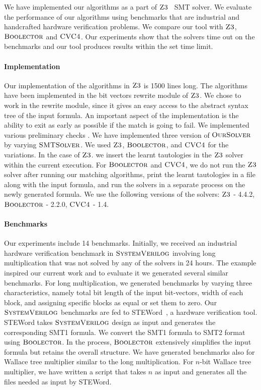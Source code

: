 

We have implemented our algorithms as a part of $\textsc{Z3}$~\cite{z3} SMT solver.
%
 We evaluate the performance of our algorithms using benchmarks that are industrial and handcrafted hardware verification problems.
%
We compare our tool with $\textsc{Z3}$, $\textsc{Boolector}$\cite{boolector} and $\textsc{CVC4}$\cite{cvc4}.
%
Our experiments show that the solvers time out on the benchmarks and our tool produces results within the set time limit.

\paragraph{\bf Implementation}
Our implementation of the algorithms in $\textsc{Z3}$ is 1500 lines long.
%
The algorithms have been implemented in the bit vectors rewrite module of $\textsc{Z3}$.
%
We chose to work in the rewrite module, since it gives an easy access to the abstract syntax tree of the input formula.
%
An important aspect of the implementation is the ability to exit as early as possible if the match is going to fail.
%
We implemented various preliminary checks .
%
We have implemented three version of $\textsc{OurSolver}$ by varying
$\textsc{SMTSolver}$.
%
We used  $\textsc{Z3}$, $\textsc{Boolector}$, and $\textsc{CVC4}$ for the variations. 
%
In the case of $\textsc{Z3}$.
we insert the learnt tautologies in the $\textsc{Z3}$ solver within the current execution.
%
For $\textsc{Boolector}$ and $\textsc{CVC4}$,
we do not run  the $\textsc{Z3}$ solver after running our matching algorithms,
print the learnt tautologies in a file along with the input formula, and
run the solvers in a separate process on the newly generated formula. We use the following versions of the solvers: $\textsc{Z3}$ - 4.4.2, $\textsc{Boolector}$ - 2.2.0, $\textsc{CVC4}$ - 1.4.

\paragraph{\bf Benchmarks}
%
Our experiments include 14 benchmarks.
%
Initially, we received an industrial hardware verification benchmark in $\textsc{SystemVerilog}$ involving long multiplication that was not solved by any of the solvers in 24 hours.
%
The example inspired our current work and to evaluate it we generated several similar benchmarks.
%
For long multiplication, we generated benchmarks by varying three characteristics, namely total bit length of the input bit-vectors, width of each block, and assigning specific blocks as equal or set them to zero.
%
Our $\textsc{SystemVerilog}$ benchmarks are fed to STEWord~\cite{Word-level-Symbolic-Trajectory-Evaluation}, a hardware verification tool.
%
STEWord takes $\textsc{SystemVerilog}$ design as input and generates the corresponding SMT1 formula.
%
We convert the SMT1 formula to SMT2 format using $\textsc{Boolector}$.
%
In the process, $\textsc{Boolector}$ extensively simplifies the input formula but retains the overall structure.
%
We have generated benchmarks also for Wallace tree multiplier similar to the long multiplication.
%
For $n$-bit Wallace tree multiplier, we have written a script that takes $n$ as input and generates all the files needed as input by STEWord.
%

